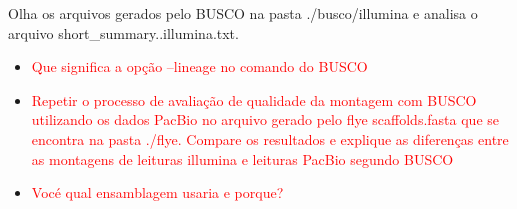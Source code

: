 \documentclass[letter,11pt]{book}
\begin{document}
Olha os arquivos gerados pelo BUSCO na pasta ./busco/illumina e analisa o arquivo short\_summary.\*.illumina.txt.
\begin{itemize}
\item \textcolor{red}{Que significa a opção --lineage no comando do BUSCO}
\item \textcolor{red}{Repetir o processo de avaliação de qualidade da montagem com BUSCO utilizando os dados PacBio no arquivo gerado pelo flye scaffolds.fasta que se encontra na pasta ./flye. Compare os resultados e explique as diferenças entre as montagens de leituras illumina e leituras PacBio segundo BUSCO}
\item \textcolor{red}{Vocé qual ensamblagem usaria e porque?}
\end{itemize}



\begin{appendices}

\label{unixguide}


\label{embossguide}


\label{blastguide}

\end{appendices} 
\end{document}
